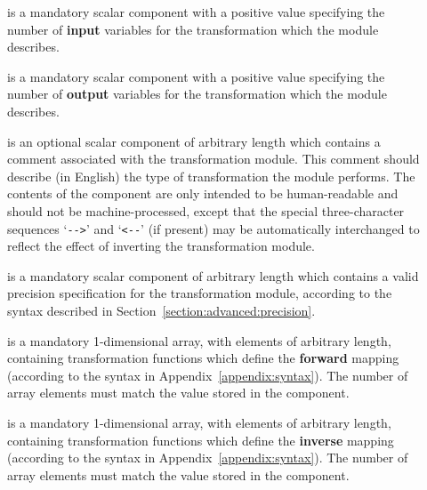 \begin{description}

\item[{\bf {}}] is a mandatory scalar 
component with a positive value specifying the number of {\bf input}
variables for the transformation which the module describes. 

\item[{\bf {}}] is a mandatory scalar 
component with a positive value specifying the number of {\bf output}
variables for the transformation which the module describes. 

\item[{\bf {}}] is an optional scalar  component of
arbitrary length which contains a comment associated with the transformation
module.
This comment should describe (in English) the type of transformation the
module performs.
The contents of the  component are only intended to be
human-readable and should not be machine-processed, except that the special
three-character sequences `\verb#-->#' and `\verb#<--#' (if present) may be
automatically interchanged to reflect the effect of inverting the
transformation module. 

\item[{\bf {}}] is a mandatory scalar  component
of arbitrary length which contains a valid precision specification for the 
transformation module, according to the syntax described in
Section~\ref{section:advanced:precision}. 

\item[{\bf {}}] is a mandatory 1-dimensional
 array, with elements of arbitrary length, containing
transformation functions which define the {\bf forward} mapping (according
to the syntax in Appendix~\ref{appendix:syntax}). 
The number of array elements must match the value stored in the 
component.

\item[{\bf {}}] is a mandatory 1-dimensional
 array, with elements of arbitrary length, containing
transformation functions which define the {\bf inverse} mapping 
(according to the syntax in Appendix~\ref{appendix:syntax}). 
The number of array elements must match the value stored in the
 component. 

\end{description}


